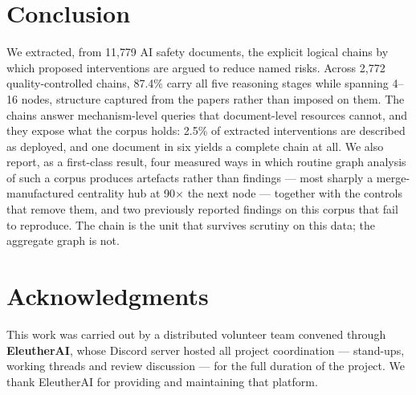 \documentclass[10pt,twocolumn,letterpaper]{article}
\begin{document}
\section{Conclusion}

We extracted, from 11{,}779 AI safety documents, the explicit logical chains by
which proposed interventions are argued to reduce named risks. Across 2{,}772
quality-controlled chains, 87.4\% carry all five reasoning stages while spanning
4--16 nodes, structure captured from the papers rather than imposed on them. The
chains answer mechanism-level queries that document-level resources cannot, and
they expose what the corpus holds: 2.5\% of extracted interventions are described
as deployed, and one document in six yields a complete chain at all. We also
report, as a first-class result, four measured ways in which
routine graph analysis of such a corpus produces artefacts rather than findings
--- most sharply a merge-manufactured centrality hub at 90$\times$ the next node
--- together with the controls that remove them, and two previously reported
findings on this corpus that fail to reproduce. The chain is the unit that
survives scrutiny on this data; the aggregate graph is not.

\section*{Acknowledgments}

This work was carried out by a distributed volunteer team convened through
\textbf{EleutherAI}, whose Discord server hosted all project coordination ---
stand-ups, working threads and review discussion --- for the full duration of the
project. We thank EleutherAI for providing and maintaining that platform.
\end{document}

